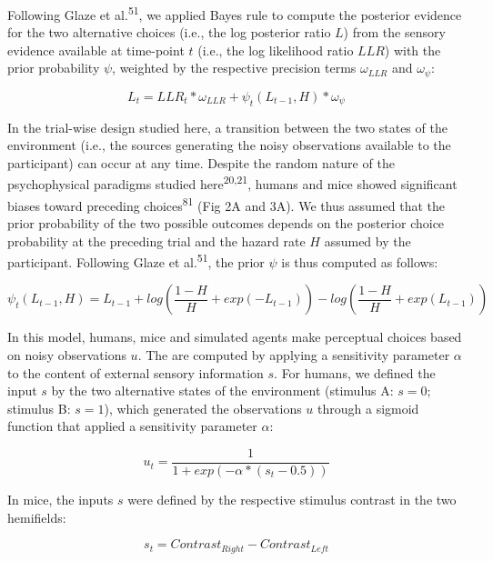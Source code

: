 \documentclass[
]{article}
\begin{document}
Following Glaze et al.\textsuperscript{51}, we applied Bayes rule to
compute the posterior evidence for the two alternative choices (i.e.,
the log posterior ratio \(L\)) from the sensory evidence available at
time-point \(t\) (i.e., the log likelihood ratio \(LLR\)) with the prior
probability \(\psi\), weighted by the respective precision terms
\(\omega_{LLR}\) and \(\omega_{\psi}\):

\begin{equation}
L_t = LLR_t * \omega_{LLR} + \psi_t(L_{t-1}, H) * \omega_{\psi}
\end{equation}

In the trial-wise design studied here, a transition between the two
states of the environment (i.e., the sources generating the noisy
observations available to the participant) can occur at any time.
Despite the random nature of the psychophysical paradigms studied
here\textsuperscript{20,21}, humans and mice showed significant biases
toward preceding choices\textsuperscript{81} (Fig 2A and 3A). We thus assumed that the
prior probability of the two possible outcomes depends on the posterior
choice probability at the preceding trial and the hazard rate \(H\)
assumed by the participant. Following Glaze et al.\textsuperscript{51},
the prior \(\psi\) is thus computed as follows:

\begin{equation}
\psi_t(L_{t-1}, H)  = L_{t-1} + log(\frac{1-H}{H} + exp(-L_{t-1})) - log(\frac{1-H}{H} + exp(L_{t-1}))
\end{equation}

In this model, humans, mice and simulated agents make perceptual choices
based on noisy observations \(u\). The are computed by applying a
sensitivity parameter \(\alpha\) to the content of external sensory
information \(s\). For humans, we defined the input \(s\) by the two
alternative states of the environment (stimulus A: \(s = 0\); stimulus
B: \(s = 1\)), which generated the observations \(u\) through a sigmoid
function that applied a sensitivity parameter \(\alpha\):

\begin{equation}
u_t = \frac{1}{1+exp(-\alpha*(s_t-0.5))}
\end{equation}

In mice, the inputs \(s\) were defined by the respective stimulus
contrast in the two hemifields:

\begin{equation}
s_t = Contrast_{Right} - Contrast_{Left}
\end{equation}
\end{document}
